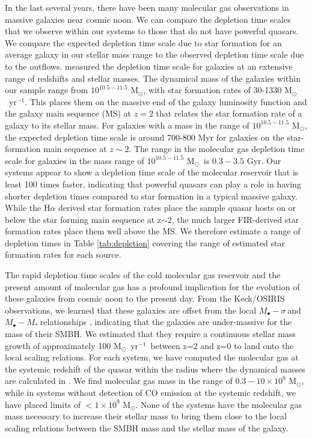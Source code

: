 \documentclass[twocolumn]{aastex63}
\newcommand{\msun}{M$_{\odot}$}
\newcommand{\myr}{M$_\odot$~yr$^{-1}$}
\newcommand{\ha}{H$\alpha$\xspace}
\newcommand{\msigma}{$M_{\bullet}-\sigma~$}
\newcommand{\mstellar}{$M_{\bullet}-M_{*}~$}
\begin{document}
In the last several years, there have been many molecular gas observations in massive galaxies near cosmic noon. We can compare the depletion time scales that we observe within our systems to those that do not have powerful quasars. We compare the expected depletion time scale due to star formation for an average galaxy in our stellar mass range to the observed depletion time scale due to the outflows. \citet{Tacconi18} measured the depletion time scale for galaxies at an extensive range of redshifts and stellar masses. The dynamical mass \citep{Vayner19b} of the galaxies within our sample range from $10^{10.5-11.5}$ \msun, with star formation rates of 30-1330 \myr. This places them on the massive end of the galaxy luminosity function and the galaxy main sequence (MS) at $z=2$ that relates the star formation rate of a galaxy to its stellar mass. For galaxies with a mass in the range of $10^{10.5-11.5}$ \msun, the expected depletion time scale is around 700-800 Myr for galaxies on the star-formation main sequence at $z\sim2$. The range in the molecular gas depletion time scale for galaxies in the mass range of $10^{10.5-11.5}$ \msun\ is $0.3-3.5$ Gyr. Our systems appear to show a depletion time scale of the molecular reservoir that is least 100 times faster, indicating that powerful quasars can play a role in having shorter depletion times compared to star formation in a typical massive galaxy. While the \ha derived star formation rates place the sample quasar hosts on or below the star forming main sequence at z$\sim$2, the much larger FIR-derived star formation rates place them well above the MS.  We therefore estimate a range of depletion times in Table \ref{tab:depletion} covering the range of estimated star formation rates for each source.

The rapid depletion time scales of the cold molecular gas reservoir and the present amount of molecular gas has a profound implication for the evolution of these galaxies from cosmic noon to the present day. From the Keck/OSIRIS observations, we learned that these galaxies are offset from the local \msigma and \mstellar relationships \citep{Vayner19b}, indicating that the galaxies are under-massive for the mass of their SMBH. We estimated that they require a continuous stellar mass growth of approximately 100 \myr\ between z=2 and z=0 to land onto the local scaling relations. For each system, we have computed the molecular gas at the systemic redshift of the quasar within the radius where the dynamical masses are calculated in \cite{Vayner19b}. We find molecular gas mass in the range of $0.3-10\times10^{9}$ \msun, while in systems without detection of CO emission at the systemic redshift, we have placed limits of $<1\times10^{9}$ \msun. None of the systems have the molecular gas mass necessary to increase their stellar mass to bring them close to the local scaling relations between the SMBH mass and the stellar mass of the galaxy.
\end{document}
